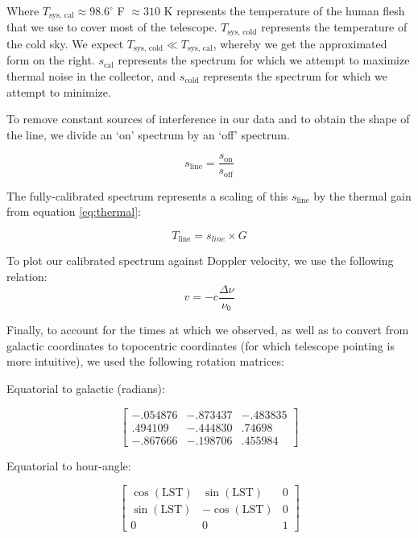 \documentclass[12pt]{article}
\begin{document}
Where $T_\text{sys, cal} \approx 98.6^\circ$ F $\approx 310$ K represents the temperature of the human flesh that we use to cover most of the telescope. $T_\text{sys, cold}$ represents the temperature of the cold sky. We expect $T_\text{sys, cold} \ll T_\text{sys, cal}$, whereby we get the approximated form on the right. $s_\text{cal}$ represents the spectrum for which we attempt to maximize thermal noise in the collector, and $s_\text{cold}$ represents the spectrum for which we attempt to minimize.

To remove constant sources of interference in our data and to obtain the shape of the line, we divide an `on' spectrum by an `off' spectrum. 

\begin{equation}
s_\text{line} = \frac{s_\text{on}}{s_\text{off}}
\end{equation}

The fully-calibrated spectrum represents a scaling of this $s_\text{line}$ by the thermal gain from equation \ref{eq:thermal}:

\begin{equation} \label{eq:normalize}
T_\text{line} = s_{line} \times G
\end{equation}

To plot our calibrated spectrum against Doppler velocity, we use the following relation:
\begin{equation} \label{eq:velocity}
v = -c \frac{\Delta \nu}{\nu_0}
\end{equation}

Finally, to account for the times at which we observed, as well as to convert from galactic coordinates to topocentric coordinates (for which telescope pointing is more intuitive), we used the following rotation matrices:

Equatorial to galactic (radians):

\begin{equation}
\begin{bmatrix}
-.054876 & -.873437 & -.483835 \\
.494109 & -.444830 & .74698 \\
-.867666 & -.198706 & .455984
\end{bmatrix}
\end{equation}

Equatorial to hour-angle:

\begin{equation}
\begin{bmatrix}
\cos(\text{LST}) & \sin(\text{LST}) & 0 \\
\sin(\text{LST}) & -\cos(\text{LST}) & 0 \\
0 & 0 & 1
\end{bmatrix}
\end{equation}
\end{document}
